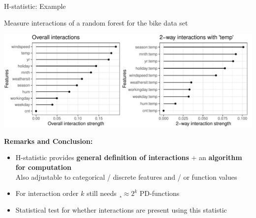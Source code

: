 \documentclass[11pt,compress,t,notes=noshow, aspectratio=169, xcolor=table]{beamer}
\begin{document}
\begin{frame}{H-statistic: Example}

Measure interactions of a random forest for the bike data set

\begin{center}
	\includegraphics[width=\textwidth]{figure/h-statistic}
\end{center}

\pause
\textbf{Remarks and Conclusion:}
\begin{itemize}
    \item H-statistic provides \textbf{general definition of interactions} + an \textbf{algorithm for computation} \\
    Also adjustable to categorical / discrete features and / or function values
    \item For interaction order $k$ still needs $¸\approx 2^k$ PD-functions
    \item Statistical test for whether interactions are present using this statistic
\end{itemize}

\end{frame}

\endlecture
\end{document}
